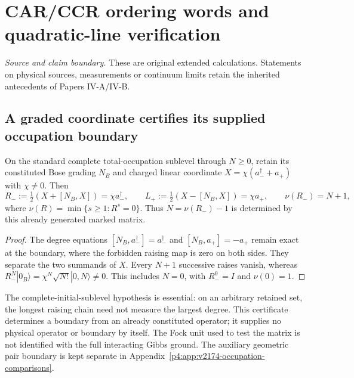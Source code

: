 \documentclass[12pt,a4paper]{article}
\begin{document}
\section{CAR/CCR ordering words and quadratic-line verification}
\label{p4c:sec:v238-c2}
\noindent\textit{Source and claim boundary.} These are original extended calculations. Statements on physical sources, measurements or continuum limits retain the inherited antecedents of Papers IV-A/IV-B.

\subsection{A graded coordinate certifies its supplied occupation boundary}
\begin{proposition}
\label{p4:prop:v2174-graded-port-boundary}
On the standard complete total-occupation sublevel through $N\ge0$,
retain its constituted Bose grading $N_B$ and charged linear coordinate
$X=\chi(a_-^\dagger+a_+)$ with $\chi\ne0$. Then
\begin{equation}
 R_-:=\tfrac12(X+[N_B,X])=\chi a_-^\dagger,\qquad
 L_+:=\tfrac12(X-[N_B,X])=\chi a_+,\qquad
 \nu(R_-)=N+1,
 \label{p4:eq:v2174-graded-port-boundary}
\end{equation}
where $\nu(R)=\min\{s\ge1:R^s=0\}$. Thus $N=\nu(R_-)-1$ is
determined by this already generated marked matrix.
\end{proposition}
\begin{proof}
The degree equations $[N_B,a_-^\dagger]=a_-^\dagger$ and
$[N_B,a_+]=-a_+$ remain exact at the boundary, where the forbidden raising
map is zero on both sides. They separate the two summands of $X$.
Every $N+1$ successive raises vanish, whereas
$R_-^N|0_B\rangle=\chi^N\sqrt{N!}|0,N\rangle\ne0$.
This includes $N=0$, with $R_-^0=I$ and $\nu(0)=1$.
\end{proof}
The complete-initial-sublevel hypothesis is essential: on an arbitrary
retained set, the longest raising chain need not measure the largest degree.
This certificate determines a boundary from an already constituted operator;
it supplies no physical operator or boundary by itself. The Fock unit used
to test the matrix is not identified with the full interacting Gibbs ground.
The auxiliary geometric pair boundary is kept separate in
Appendix~\ref{p4:app:v2174-occupation-comparisons}.



\end{document}
